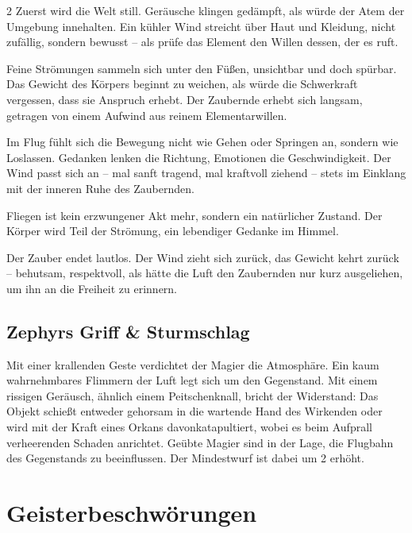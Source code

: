 \begin{multicols*}{2}
Zuerst wird die Welt still. Geräusche klingen gedämpft, als würde der Atem der Umgebung innehalten. Ein kühler Wind streicht über Haut und Kleidung, nicht zufällig, sondern bewusst – als prüfe das Element den Willen dessen, der es ruft.

Feine Strömungen sammeln sich unter den Füßen, unsichtbar und doch spürbar. Das Gewicht des Körpers beginnt zu weichen, als würde die Schwerkraft vergessen, dass sie Anspruch erhebt. Der Zaubernde erhebt sich langsam, getragen von einem Aufwind aus reinem Elementarwillen.

Im Flug fühlt sich die Bewegung nicht wie Gehen oder Springen an, sondern wie Loslassen. Gedanken lenken die Richtung, Emotionen die Geschwindigkeit. Der Wind passt sich an – mal sanft tragend, mal kraftvoll ziehend – stets im Einklang mit der inneren Ruhe des Zaubernden.

Fliegen ist kein erzwungener Akt mehr, sondern ein natürlicher Zustand. Der Körper wird Teil der Strömung, ein lebendiger Gedanke im Himmel.

Der Zauber endet lautlos. Der Wind zieht sich zurück, das Gewicht kehrt zurück – behutsam, respektvoll, als hätte die Luft den Zaubernden nur kurz ausgeliehen, um ihn an die Freiheit zu erinnern.



\subsection{Zephyrs Griff \& Sturmschlag}

Mit einer krallenden Geste verdichtet der Magier die Atmosphäre. Ein kaum wahrnehmbares Flimmern der Luft legt sich um den Gegenstand. Mit einem rissigen Geräusch, ähnlich einem Peitschenknall, bricht der Widerstand: Das Objekt schießt entweder gehorsam in die wartende Hand des Wirkenden oder wird mit der Kraft eines Orkans davonkatapultiert, wobei es beim Aufprall verheerenden Schaden anrichtet. Geübte Magier sind in der Lage, die Flugbahn des Gegenstands zu beeinflussen. Der Mindestwurf ist dabei um 2 erhöht.



\section{Geisterbeschwörungen}


\end{multicols*}
